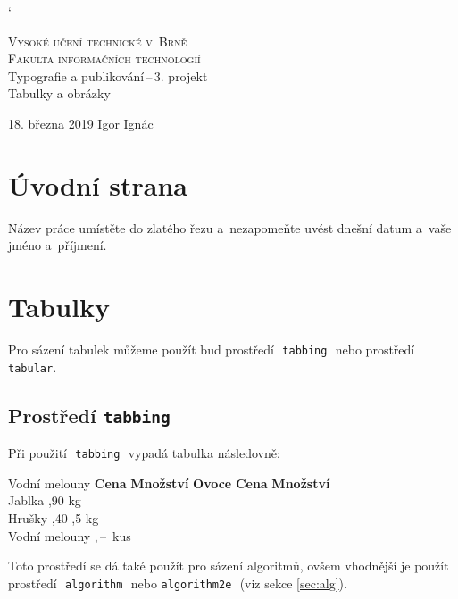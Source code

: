 \documentclass[a4paper, titlepage, 11pt]{article}
\begin{document}
\catcode`

  \begin{titlepage}
    \begin{center}
      \Huge \textsc{Vysoké učení technické v~Brně}\\
      \huge \textsc{Fakulta informačních technologií}\\
      \LARGE Typografie a publikování\,--\,3. projekt\\
      \Huge Tabulky a obrázky
    \end{center}
    {\Large 18. března 2019 \hfill Igor Ignác}
  \end{titlepage}

\section{Úvodní strana}
Název práce umístěte do zlatého řezu a~nezapomeňte uvést dnešní datum a~vaše jméno a~příjmení.

\section{Tabulky}
Pro sázení tabulek můžeme použít buď prostředí\,\, \verb|tabbing|\,\, nebo prostředí\,\, \verb|tabular|.

\subsection{Prostředí \texttt{tabbing}}
Při použití\,\, \verb|tabbing|\,\, vypadá tabulka následovně:

\begin{tabbing}
  Vodní melouny \quad \= \textbf{Cena} \quad \= \textbf{Množství}\kill
  \textbf{Ovoce} \> \textbf{Cena} \> \textbf{Množství}\\
  Jablka ,90  kg\\
  Hrušky ,40 ,5 kg\\
  Vodní melouny ,\,--\,  kus\\
\end{tabbing}
Toto prostředí se dá také použít pro sázení algoritmů, ovšem vhodnější je použít prostředí\,\, \verb|algorithm|\,\, nebo \verb|algorithm2e|\,\, (viz sekce \ref{sec:alg}).
\end{document}
